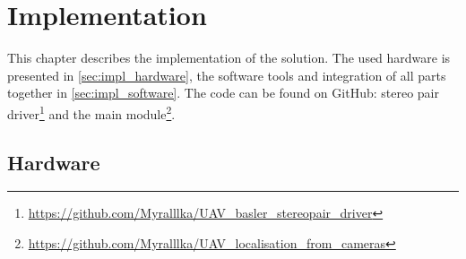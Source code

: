 \chapter{Implementation}
\label{chapter:implementation}

This chapter describes the implementation of the solution.
The used hardware is presented in \autoref{sec:impl_hardware}, the software tools and integration of all parts together in \autoref{sec:impl_software}. The code can be found on GitHub: stereo pair driver\footnote{\url{https://github.com/Myralllka/UAV_basler_stereopair_driver}} and the main module\footnote{\url{https://github.com/Myralllka/UAV_localisation_from_cameras}}.

\section{Hardware}
\label{sec:impl_hardware}
